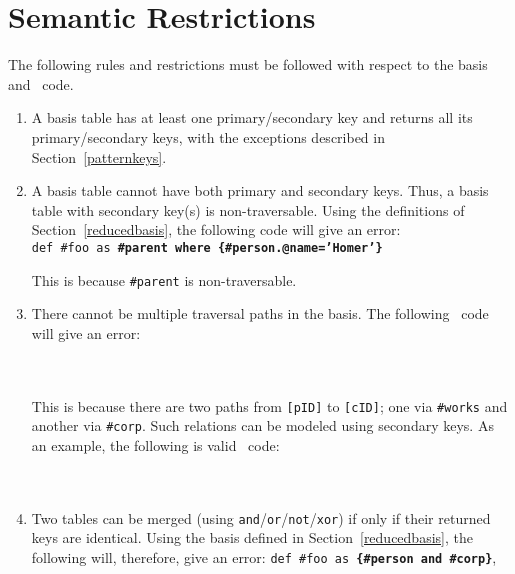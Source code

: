 \section{Semantic Restrictions} 
\label{semantic}
		The following rules and restrictions must be followed with respect to the basis and \dsl~code.
\begin{enumerate}
	\item A basis table has at least one primary/secondary key and returns all its primary/secondary keys, with the exceptions described in Section~\ref{patternkeys}.
	\item A basis table cannot have both primary and secondary keys. Thus, a basis table with secondary key(s) is non-traversable.
	Using the definitions of Section~\ref{reducedbasis}, the following code will give an error:\\
	\texttt{\small \colorbox{Light}{def \#foo as \bfseries\#parent where \{\#person.@name='Homer'\}}}
	
This is because \texttt{\#parent} is non-traversable.
	\item There cannot be multiple traversal paths in the basis. 
	The following \dcl~code will give an error:\\
{\small
{}\\
\\
}

This is because there are two paths from \texttt{[pID]} to \texttt{[cID]}; one via \texttt{\#works} and another via \texttt{\#corp}. Such relations can be modeled using secondary keys. As an example, the following is valid \dcl~code:\\%
	{\small
{}\\
\\
}
	\item Two tables can be merged (using \texttt{and}/\texttt{or}/\texttt{not}/\texttt{xor}) if only if their returned keys are identical. Using the basis defined in Section~\ref{reducedbasis}, the following will, therefore, give an error: \texttt{\small \colorbox{Light}{def \#foo as \bfseries{\{\#person and \#corp\}}}},
		

\end{enumerate}
